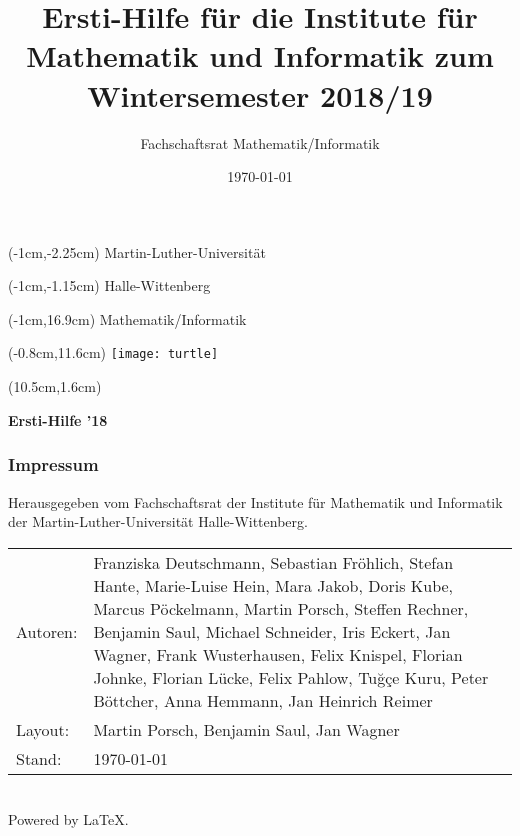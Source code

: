 \thispagestyle{empty}

\title{Ersti-Hilfe für die Institute für 
    Mathematik und Informatik zum
    Wintersemester 2018/19}
\author{Fachschaftsrat Mathematik/Informatik}
\date{\today}


\fontsize{1.05cm}{1cm}
\begin{textblock*}{\paperwidth}(-1cm,-2.25cm)
 \textsf{Martin-Luther-Universität}
\end{textblock*}
\begin{textblock*}{\paperwidth}(-1cm,-1.15cm)
 \textsf{Halle-Wittenberg}
\end{textblock*}
\begin{textblock*}{\paperwidth}(-1cm,16.9cm)
 \textsf{Mathematik/Informatik}
\end{textblock*}
\begin{textblock*}{\paperwidth}(-0.8cm,11.6cm)
 \texttt{[image: turtle]}
\end{textblock*}
\fontsize{2.56cm}{1cm}
\begin{textblock*}{\paperwidth}(10.5cm,1.6cm)
 \begin{sideways}
  \textsf{\textbf{Ersti-Hilfe ’18}}
 \end{sideways}
\end{textblock*}
\normalsize

\newpage
\thispagestyle{empty}
\subsubsection{Impressum}
Herausgegeben vom Fachschaftsrat der Institute für Mathematik und Informatik der
Martin-Luther-Universität Halle-Wittenberg.\\[1.0em]
\begin{tabularx}{\textwidth}{@{}lX@{}}
 Autoren: & Franziska Deutschmann,                                              %
            Sebastian Fröhlich,
            Stefan Hante,
            Marie-Luise Hein,
            Mara Jakob,
            Doris Kube,
            Marcus Pöckelmann,
            Martin Porsch,
            Steffen Rechner,
            Benjamin Saul,
            Michael Schneider,
            Iris Eckert,
            Jan Wagner,
            Frank Wusterhausen,
            Felix Knispel,
            Florian Johnke,
            Florian Lücke,
            Felix Pahlow,
            Tuğçe Kuru,
            Peter Böttcher,
            Anna Hemmann,
            Jan Heinrich Reimer\\
 Layout:  & Martin Porsch, Benjamin Saul, Jan Wagner\\
 Stand:   & \today\\
\end{tabularx}\\[1.0em]
Powered by \LaTeX.
\pagebreak

